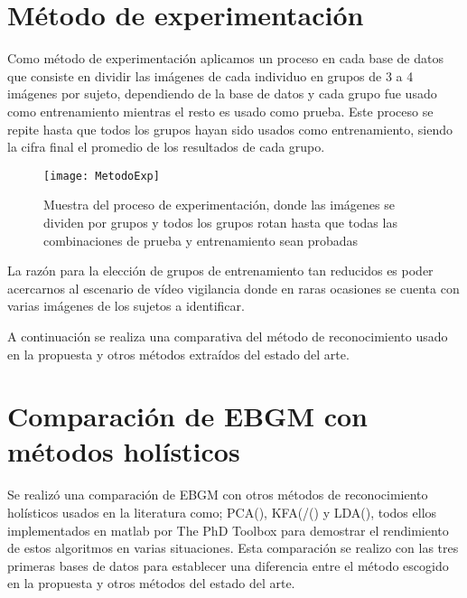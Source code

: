 \section{Método de experimentación}\label{scc:MetdoEx}
Como método de experimentación aplicamos un proceso en cada base de datos que consiste en dividir las imágenes de cada individuo en grupos de 3 a 4 imágenes por sujeto, dependiendo de la base de datos y cada grupo fue usado como entrenamiento mientras el resto es usado como prueba. Este proceso se repite hasta que todos los grupos hayan sido usados como entrenamiento, siendo la cifra final el promedio de los resultados de cada grupo.

\begin{figure}[h]
	\centering
	\texttt{[image: MetodoExp]}
    \caption{Muestra del proceso de experimentación, donde las imágenes se dividen por grupos y todos los grupos rotan hasta que todas las combinaciones de prueba y entrenamiento sean probadas}
    \label{metodo}
\end{figure}

La razón para la elección de grupos de entrenamiento tan reducidos es poder acercarnos al escenario de vídeo vigilancia donde en raras ocasiones se cuenta con varias imágenes de los sujetos a identificar.

A continuación se realiza una comparativa del método de reconocimiento usado en la propuesta y otros métodos extraídos del estado del arte.

\section{Comparación de \ac{EBGM} con métodos holísticos}\label{scc:Comparacion}
Se realizó una comparación de \ac{EBGM} con otros métodos de reconocimiento holísticos usados en la literatura como; \ac{PCA}(\cite{turk1991eigenfaces}), \ac{KFA}(/(\cite{yang2002kernel}) y \ac{LDA}(\cite{zhao1999subspace}), todos ellos implementados en matlab por The PhD Toolbox \cite{struc2012phd} para demostrar el rendimiento de estos algoritmos en varias situaciones. Esta comparación se realizo con las tres primeras bases de datos para establecer una diferencia entre el método escogido en la propuesta y otros métodos del estado del arte.

